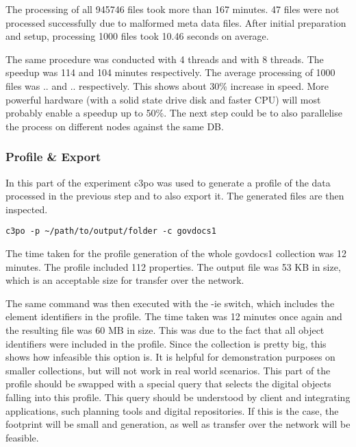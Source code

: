 The processing of all 945746 files took more than 167 minutes. 47 files were not processed successfully due to malformed meta data files. After initial preparation and setup, processing 1000 files took 10.46 seconds on average.

The same procedure was conducted with 4 threads and with 8 threads. The speedup was 114 and 104 minutes respectively. The average processing of 1000 files was .. and .. respectively. This shows about 30\% increase in speed. More powerful hardware (with a solid state drive disk and faster CPU) will most probably enable a speedup up to 50\%. The next step could be to also parallelise the process on different nodes against the same DB.

\subsubsection{Profile \& Export}
In this part of the experiment c3po was used to generate a profile of the data processed in the previous step and to also export it. The generated files are then inspected.

\begin{verbatim}
c3po -p ~/path/to/output/folder -c govdocs1
\end{verbatim}

The time taken for the profile generation of the whole govdocs1 collection was 12 minutes. The profile included 112 properties. The output file was 53 KB in size, which is an acceptable size for transfer over the network.

The same command was then executed with the -ie switch, which includes the element identifiers in the profile.
The time taken was 12 minutes once again and the resulting file was 60 MB in size. This was due to the fact that all object identifiers were included in the profile. Since the collection is pretty big, this shows how infeasible this option is. It is helpful for demonstration purposes on smaller collections, but will not work in real world scenarios. This part of the profile should be swapped with a special query that selects the digital objects falling into this profile. This query should be understood by client and integrating applications, such planning tools and digital repositories. If this is the case, the footprint will be small and generation, as well as transfer over the network will be feasible.


